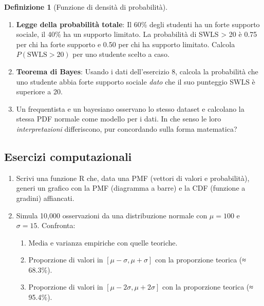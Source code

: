 \documentclass[
  italian,
  letterpaper,
  a4paper,
  11pt,
  open=any]{scrbook}
\providecommand{\tightlist}{%
  \setlength{\itemsep}{0pt}\setlength{\parskip}{0pt}}
\theoremstyle{plain}
\theoremstyle{definition}
\theoremstyle{definition}
\newtheorem{definition}{Definizione}[chapter]
\theoremstyle{remark}
\begin{document}
\begin{definition}[Funzione di densità di
probabilità]
\begin{tcolorbox}
\begin{enumerate}
\def\labelenumi{\arabic{enumi}.}
\setcounter{enumi}{7}
\item
  \textbf{Legge della probabilità totale}: Il 60\% degli studenti ha un
  forte supporto sociale, il 40\% ha un supporto limitato. La
  probabilità di SWLS \textgreater{} 20 è 0.75 per chi ha forte supporto
  e 0.50 per chi ha supporto limitato. Calcola \(P(\text{SWLS} > 20)\)
  per uno studente scelto a caso.
\item
  \textbf{Teorema di Bayes}: Usando i dati dell'esercizio 8, calcola la
  probabilità che uno studente abbia forte supporto sociale \emph{dato}
  che il suo punteggio SWLS è superiore a 20.
\item
  Un frequentista e un bayesiano osservano lo stesso dataset e calcolano
  la stessa PDF normale come modello per i dati. In che senso le loro
  \emph{interpretazioni} differiscono, pur concordando sulla forma
  matematica?
\end{enumerate}

\subsection*{Esercizi computazionali}\label{esercizi-computazionali-2}

\begin{enumerate}
\def\labelenumi{\arabic{enumi}.}
\setcounter{enumi}{10}
\item
  Scrivi una funzione R che, data una PMF (vettori di valori e
  probabilità), generi un grafico con la PMF (diagramma a barre) e la
  CDF (funzione a gradini) affiancati.
\item
  Simula 10,000 osservazioni da una distribuzione normale con
  \(\mu = 100\) e \(\sigma = 15\). Confronta:

  \begin{enumerate}
  \def\labelenumii{\alph{enumii}.}
  \tightlist
  \item
    Media e varianza empiriche con quelle teoriche.
  \item
    Proporzione di valori in \([\mu - \sigma, \mu + \sigma]\) con la
    proporzione teorica (≈ 68.3\%).
  \item
    Proporzione di valori in \([\mu - 2\sigma, \mu + 2\sigma]\) con la
    proporzione teorica (≈ 95.4\%).
  \end{enumerate}
\end{enumerate}

\end{tcolorbox}


\end{definition}
\end{document}
